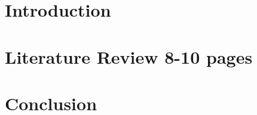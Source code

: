 


\newpage
\section{Introduction} \label{sec:introduction}


\newpage
\section{Literature Review 8-10 pages} \label{sec:literature-review}


\newpage
\section{Conclusion} \label{sec:conclusion}


\newpage



\newpage

